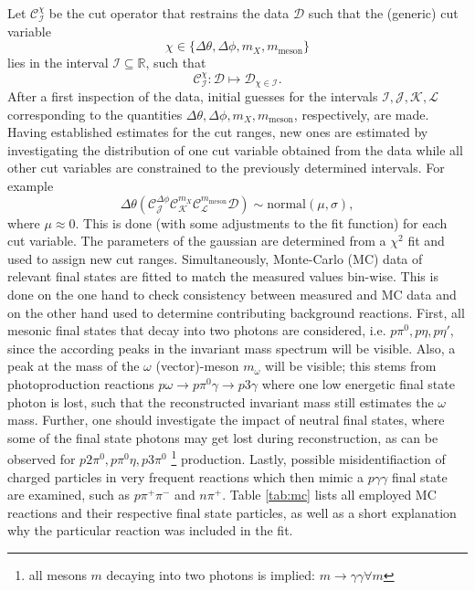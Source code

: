 Let $\mathcal{C}^\chi_{\mathcal{I}}$ be the cut operator that restrains the data $\mathcal{D}$ such that the (generic) cut variable $$\chi\in\{\Delta\theta,\Delta\phi,m_X,m_\text{meson}\}$$ lies in the interval $\mathcal{I}\subseteq\mathbb{R}$, such that 
\begin{equation}
	\mathcal{C}_{\mathcal{I}}^\chi:\mathcal{D}\mapsto\mathcal{D}_{\chi\in\mathcal{I}} .
\end{equation}
	 After a first inspection of the data, initial guesses for the intervals $\mathcal{I},\mathcal{J},\mathcal{K},\mathcal{L}$ corresponding to the quantities $\Delta\theta,\Delta\phi,m_X,m_\text{meson}$, respectively, are made.
	Having established estimates for the cut ranges, new ones are estimated by investigating the distribution of one cut variable obtained from the data while all other cut variables are constrained to the previously determined intervals. For example 
	$$\Delta\theta\left(\mathcal{C}_\mathcal{J}^{\Delta\phi}\mathcal{C}_\mathcal{K}^{m_X}\mathcal{C}_\mathcal{L}^{m_\text{meson}}\mathcal{D}\right)\sim \text{normal}(\mu,\sigma),$$
	where $\mu\approx0$. This is done (with some adjustments to the fit function) for each cut variable. The parameters of the gaussian are determined from a $\chi^2$ fit and used to assign new cut ranges. Simultaneously, Monte-Carlo (MC) data of relevant final states are fitted to match the measured values bin-wise. This is done on the one hand to check consistency between measured and MC data and on the other hand used to determine contributing background reactions. First, all mesonic final states that decay into two photons are considered, i.e. $p\pi^0,p\eta,p\eta'$, since the according peaks in the invariant mass spectrum will be visible. Also, a peak at the mass of the $\omega$ (vector)-meson $m_\omega$ will be visible; this stems from photoproduction reactions $p\omega\to p\pi^0\gamma\to p3\gamma$ where one low energetic final state photon is lost, such that the reconstructed invariant mass still estimates the $\omega$ mass. Further, one should investigate the impact of neutral final states, where some of the final state photons may get lost during reconstruction, as can be observed for $p2\pi^0,p\pi^0\eta,p3\pi^0$ \footnote{all mesons $m$ decaying into two photons is implied: $m\to\gamma\gamma \forall m$} production. Lastly, possible misidentifiaction of charged particles in very frequent reactions which then mimic a $p\gamma\gamma$ final state are examined, such as $p\pi^+\pi^-$ and $n\pi^+$. Table \ref{tab:mc} lists all employed MC reactions and their respective final state particles, as well as a short explanation why the particular reaction was included in the fit.
	

